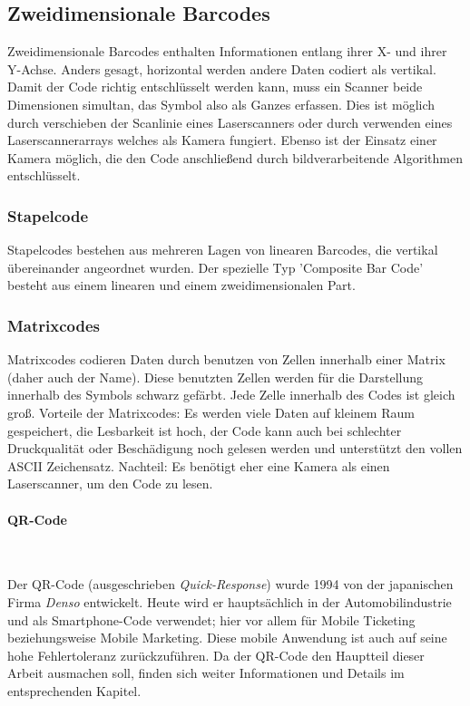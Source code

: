\subsection{Zweidimensionale Barcodes}
Zweidimensionale Barcodes enthalten Informationen entlang ihrer X- und ihrer Y-Achse. Anders gesagt, horizontal werden andere Daten codiert als vertikal.
Damit der Code richtig entschlüsselt werden kann, muss ein Scanner beide Dimensionen simultan, das Symbol also als Ganzes erfassen. Dies ist möglich durch verschieben der Scanlinie eines Laserscanners oder durch verwenden eines Laserscannerarrays welches als Kamera fungiert. Ebenso ist der Einsatz einer Kamera möglich, die den Code anschließend durch bildverarbeitende Algorithmen entschlüsselt.

\subsubsection{Stapelcode}
Stapelcodes bestehen aus mehreren Lagen von linearen Barcodes, die vertikal übereinander angeordnet wurden.
Der spezielle Typ 'Composite Bar Code' besteht aus einem linearen und einem zweidimensionalen Part.

\subsubsection{Matrixcodes}
Matrixcodes codieren Daten durch benutzen von Zellen innerhalb einer Matrix (daher auch der Name). Diese benutzten Zellen werden für die Darstellung innerhalb des Symbols schwarz gefärbt. Jede Zelle innerhalb des Codes ist gleich groß. 
Vorteile der Matrixcodes: Es werden viele Daten auf kleinem Raum gespeichert, die Lesbarkeit ist hoch, der Code kann auch bei schlechter Druckqualität oder Beschädigung noch gelesen werden und unterstützt den vollen ASCII Zeichensatz.
Nachteil: Es benötigt eher eine Kamera als einen Laserscanner, um den Code zu lesen. 
\samepage
\paragraph{QR-Code}~

Der QR-Code (ausgeschrieben \textit{Quick-Response}) wurde 1994 von der japanischen Firma \textit{Denso} entwickelt. Heute wird er hauptsächlich in der Automobilindustrie und als Smartphone-Code verwendet; hier vor allem für Mobile Ticketing beziehungsweise Mobile Marketing. Diese mobile Anwendung ist auch auf seine hohe Fehlertoleranz zurückzuführen. Da der QR-Code den Hauptteil dieser Arbeit ausmachen soll, finden sich weiter Informationen und Details im entsprechenden Kapitel.

